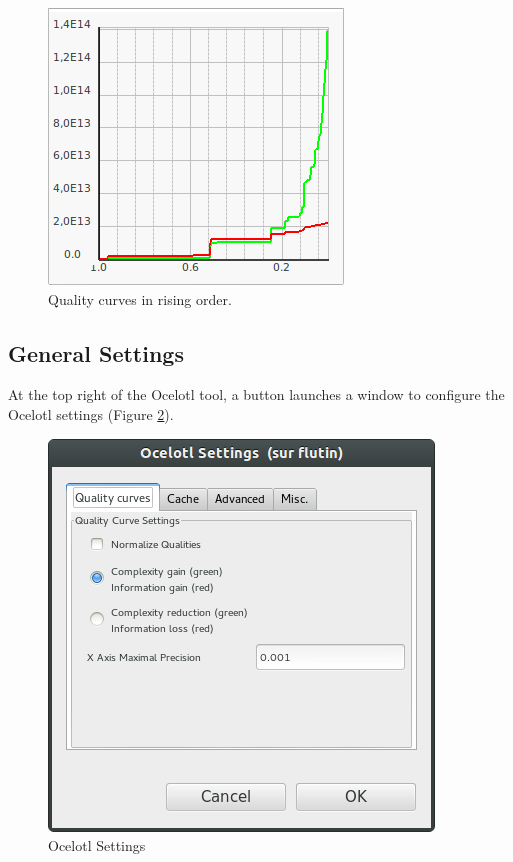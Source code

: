 \documentclass[twoside]{article}
\begin{document}
\begin{sloppypar}
\begin{figure}[h!]
	\centering
	\includegraphics[scale=0.5]{images/ocelotlCurves.png}
	\caption{Quality curves in rising order.}
	\label{aggregCurves}
\end{figure}

\subsection{General Settings}
At the top right of the Ocelotl tool, a button launches a window to configure the Ocelotl settings (Figure \ref{ocelotlsettings}).

\begin{figure}[h!]
	\centering
	\includegraphics[scale=0.5]{images/ocelotlSettings.png}
	\caption{Ocelotl Settings}
	\label{ocelotlsettings}
\end{figure}


\end{sloppypar}
\end{document}
